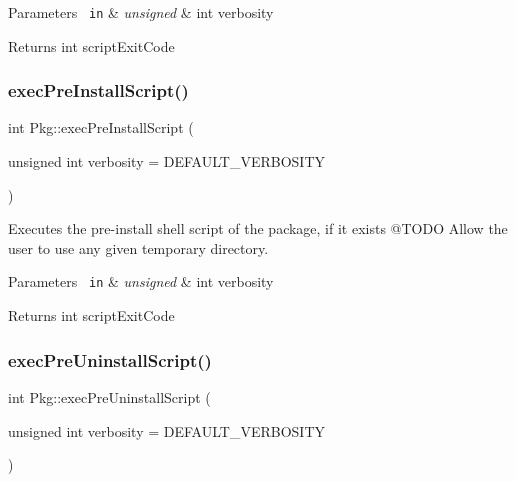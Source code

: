 \begin{DoxyParams}[1]{Parameters}
\mbox{\texttt{ in}}  & {\em unsigned} & int verbosity\\
\hline
\end{DoxyParams}
\begin{DoxyReturn}{Returns}
int script\+Exit\+Code 
\end{DoxyReturn}
\mbox{\label{classPkg_ab525ef2d1db4d21a2dac6bfebeaeb881}} 
\subsubsection{\texorpdfstring{execPreInstallScript()}{execPreInstallScript()}}
{\footnotesize\ttfamily int Pkg\+::exec\+Pre\+Install\+Script (\begin{DoxyParamCaption}\item[{unsigned int}]{verbosity = {\ttfamily DEFAULT\+\_\+VERBOSITY} }\end{DoxyParamCaption})}



Executes the pre-\/install shell script of the package, if it exists @\+T\+O\+DO Allow the user to use any given temporary directory. 


\begin{DoxyParams}[1]{Parameters}
\mbox{\texttt{ in}}  & {\em unsigned} & int verbosity\\
\hline
\end{DoxyParams}
\begin{DoxyReturn}{Returns}
int script\+Exit\+Code 
\end{DoxyReturn}
\mbox{\label{classPkg_aaf0fa6056c0ae99a40aee7ac4990f613}} 
\subsubsection{\texorpdfstring{execPreUninstallScript()}{execPreUninstallScript()}}
{\footnotesize\ttfamily int Pkg\+::exec\+Pre\+Uninstall\+Script (\begin{DoxyParamCaption}\item[{unsigned int}]{verbosity = {\ttfamily DEFAULT\+\_\+VERBOSITY} }\end{DoxyParamCaption})}




